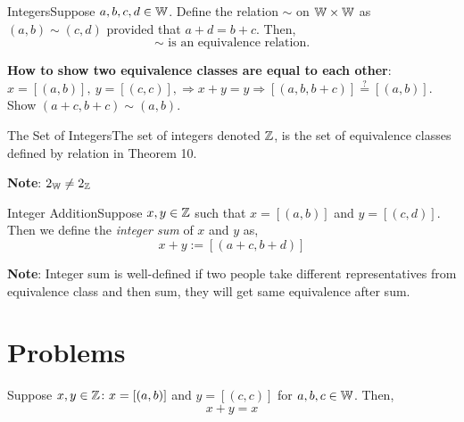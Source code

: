             \begin{ntheorem}
               {Integers}Suppose \(a,b,c,d \in \mathbb{W}\). Define the relation \(\sim\) on \(\mathbb{W} \times \mathbb{W}\) as \((a,b) \sim (c,d)\) provided that \(a + d = b + c\). Then, \[\sim \text{ is an equivalence relation}.\] 
            \end{ntheorem}

            \textbf{How to show two equivalence classes are equal to each other}: \\
            \(x = [(a,b)], \ y = [(c,c)], \Rightarrow  x + y = y \Rightarrow [(a,b, b + c)] \stackrel{?}{=} [(a,b)]\). Show \((a+c,b+c) \sim (a,b)\).

            \begin{definition}
                {The Set of Integers}The set of integers denoted \(\mathbb{Z}\), is the set of equivalence classes defined by relation in Theorem 10.
            \end{definition}

            \noindent \textbf{Note}: \(2_{\mathbb{W}} \ne 2_{\mathbb{Z}}\)

            \begin{definition}
                {Integer Addition}Suppose \(x,y \in \mathbb{Z}\) such that \(x=[(a,b)]\) and \(y = [(c,d)]\). Then we define the \textit{integer sum} of \(x\) and \(y\) as, \[x + y := [(a + c, b + d)]\]
            \end{definition}

            \noindent \textbf{Note}: Integer sum is well-defined if two people take different representatives from equivalence class and then sum, they will get same equivalence after sum.

    \vspace{0.5cm}

        \section{Problems}

    
            \begin{exercise}
                {}Suppose \(x,y \in \mathbb{Z} \colon x = [(a,b)]\) and \(y = [(c,c)]\) for \(a,b,c \in \mathbb{W}\). Then, \[x + y = x\]
            \end{exercise}
    

